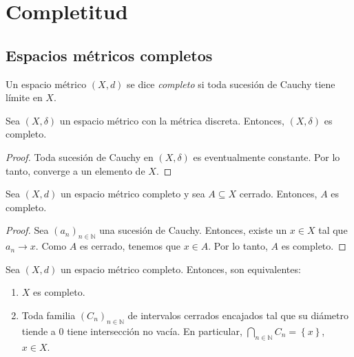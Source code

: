 \chapter{Completitud}

\section{Espacios métricos completos}

\begin{definition}
	Un espacio métrico $(X, d)$ se dice \emph{completo} si toda sucesión de Cauchy tiene límite en $X$.
\end{definition}

\begin{example}
	Sea $(X, \delta)$ un espacio métrico con la métrica discreta. Entonces, $(X, \delta)$ es completo.
\end{example}

\begin{proof}
	Toda sucesión de Cauchy en $(X, \delta)$ es eventualmente constante. Por lo tanto, converge a un elemento de $X$.
\end{proof}

\begin{proposition}
	Sea $(X, d)$ un espacio métrico completo y sea $A \subseteq X$ cerrado. Entonces, $A$ es completo.
\end{proposition}

\begin{proof}
	Sea $(a_n)_{n \in \mathbb{N}}$ una sucesión de Cauchy. Entonces, existe un $x \in X$ tal que $a_n \longrightarrow x$. Como $A$ es cerrado, tenemos que $x \in A$. Por lo tanto, $A$ es completo.
\end{proof}

\begin{theorem}
	Sea $(X, d)$ un espacio métrico completo. Entonces, son equivalentes:
	\begin{enumerate}
		\item $X$ es completo.
		\item Toda familia $(C_n)_{n \in \mathbb{N}}$ de intervalos cerrados encajados tal que su diámetro tiende a $0$ tiene intersección no vacía. En particular, $\bigcap_{n \in \mathbb{N}} C_n = \left\{ x \right\}$, $x \in X$.
	\end{enumerate}
\end{theorem}

